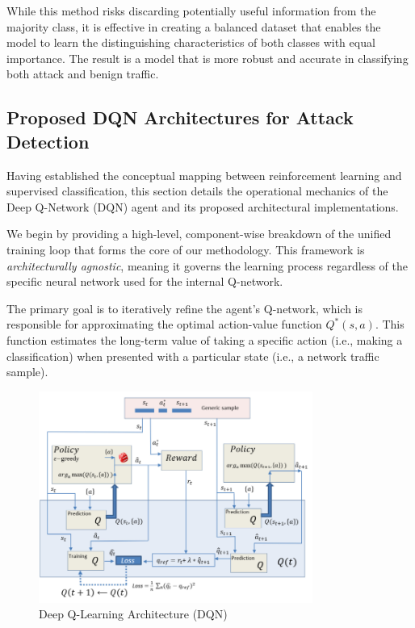 \documentclass[12pt]{report}
\begin{document}
While this method risks discarding potentially useful information from the majority class, it is effective in creating a balanced dataset that enables the model to learn the distinguishing characteristics of both classes with equal importance. The result is a model that is more robust and accurate in classifying both attack and benign traffic.

\subsection{Proposed DQN Architectures for Attack Detection}

Having established the conceptual mapping between reinforcement learning and supervised classification, this section details the operational mechanics of the Deep Q-Network (DQN) agent and its proposed architectural implementations.

We begin by providing a high-level, component-wise breakdown of the unified training loop that forms the core of our methodology. This framework is \textit{architecturally agnostic}, meaning it governs the learning process regardless of the specific neural network used for the internal Q-network.

The primary goal is to iteratively refine the agent’s Q-network, which is responsible for approximating the optimal action-value function \( Q^*(s, a) \). This function estimates the long-term value of taking a specific action (i.e., making a classification) when presented with a particular state (i.e., a network traffic sample).


\begin{figure}[htbp]
    \centering
    \includegraphics[width=0.8\textwidth]{images/dqn-arch.png}
    \caption{Deep Q-Learning Architecture (DQN)}
    \label{fig:dqn-arch}
\end{figure}
\end{document}
